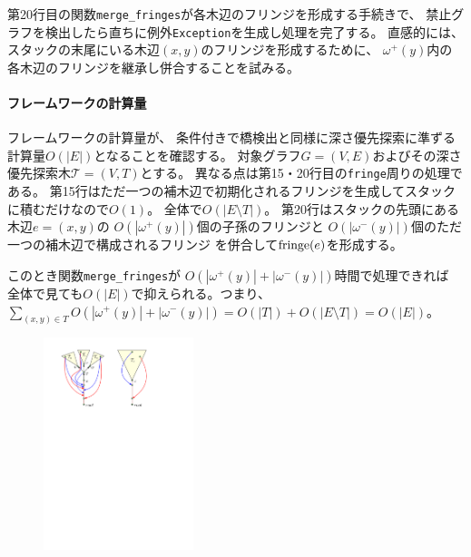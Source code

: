 第20行目の関数{\tt merge\_fringes}が各木辺のフリンジを形成する手続きで、
禁止グラフを検出したら直ちに例外{\tt Exception}を生成し処理を完了する。
直感的には、
スタックの末尾にいる木辺$(x, y)$のフリンジを形成するために、
$\omega^+(y)$内の各木辺のフリンジを継承し併合することを試みる。



\begin{paracol}{2}
\paragraph{フレームワークの計算量}
フレームワークの計算量が、
条件付きで橋検出と同様に深さ優先探索に準ずる計算量$O(|E|)$となることを確認する。
対象グラフ$G=(V, E)$およびその深さ優先探索木${\mathcal T}=(V, T)$とする。
異なる点は第15・20行目の{\tt fringe}周りの処理である。
第15行はただ一つの補木辺で初期化されるフリンジを生成してスタックに積むだけなので$O(1)$。
全体で$O(|E\setminus T|)$。
第20行はスタックの先頭にある木辺$e=(x, y)$の
$O(|\omega^+(y)|)$個の子孫のフリンジと
$O(|\omega^-(y)|)$個のただ一つの補木辺で構成されるフリンジ
を併合して$\operatorname{fringe}(e)$を形成する。

このとき関数{\tt merge\_fringes}が
$O(|\omega^+(y)|+|\omega^-(y)|)$時間で処理できれば
全体で見ても$O(|E|)$で抑えられる。つまり、\\
$\sum_{(x, y) \in T}O(|\omega^+(y)|+|\omega^-(y)|)=
O(|T|)+O(|E\setminus T|)=O(|E|)$。



\switchcolumn
\vspace{1.5\intextsep}
\begin{figure}[ht]
\centering
\includegraphics[width=0.39\textwidth]{figures/merging_upper_fringes.pdf}
\end{figure}
\end{paracol}

